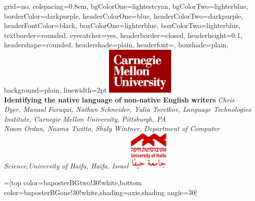 \documentclass[landscape,final]{baposter}
\begin{document}
\begin{poster}{
  grid=no,
  colspacing=0.8em,
  bgColorOne=lightestcyan, %
  bgColorTwo=lighterblue, %
  borderColor=darkpurple, %
  headerColorOne=blue, %
  headerColorTwo=darkpurple, %
  headerFontColor=black,
  boxColorOne=lighterblue, %
  boxColorTwo=lighterblue, %
  textborder=rounded, %
  eyecatcher=yes,
  headerborder=closed,
  headerheight=0.1\textheight,
  headershape=rounded, %
  headershade=plain,
  headerfont=\Large\textsf, %
  boxshade=plain,
  background=plain,
  linewidth=2pt
  }
  {%
\includegraphics[width=9em]{img/CarnegieMellonUniversity}\\
} %
  {\bf %
  Identifying the native language of non-native English writers
  }
  {\large\sl %
  Chris Dyer, Manaal Faruqui, Nathan Schneider, Yulia Tsvetkov, Language Technologies Institute,
  Carnegie Mellon University, Pittsburgh, PA
  \large
  \\Noam Ordan, Naama Twitto, Shuly Wintner,
  Department of Computer Science,University of Haifa, Haifa, Israel
  }
  {  \includegraphics[height=5.1em]{img/haifa_univ_logo} %
  }

  =[top color=baposterBGtwo!30!white,bottom color=baposterBGone!30!white,shading=axis,shading angle=30]



\end{poster}
\end{document}
